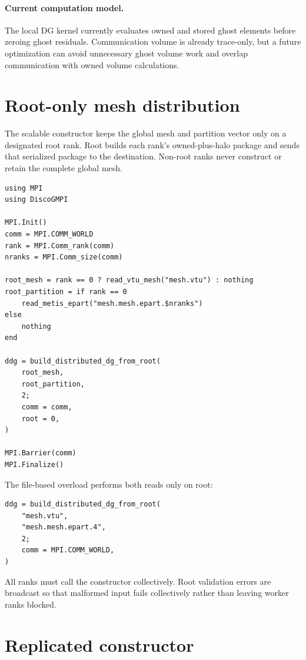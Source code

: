 \documentclass[11pt,oneside]{book}
\begin{document}
\paragraph{Current computation model.}
The local DG kernel currently evaluates owned and stored ghost elements before
zeroing ghost residuals. Communication volume is already trace-only, but a
future optimization can avoid unnecessary ghost volume work and overlap
communication with owned volume calculations.

\section{Root-only mesh distribution}

The scalable constructor keeps the global mesh and partition vector only on a
designated root rank. Root builds each rank's owned-plus-halo package and sends
that serialized package to the destination. Non-root ranks never construct or
retain the complete global mesh.

\begin{lstlisting}
using MPI
using DiscoGMPI

MPI.Init()
comm = MPI.COMM_WORLD
rank = MPI.Comm_rank(comm)
nranks = MPI.Comm_size(comm)

root_mesh = rank == 0 ? read_vtu_mesh("mesh.vtu") : nothing
root_partition = if rank == 0
    read_metis_epart("mesh.mesh.epart.$nranks")
else
    nothing
end

ddg = build_distributed_dg_from_root(
    root_mesh,
    root_partition,
    2;
    comm = comm,
    root = 0,
)

MPI.Barrier(comm)
MPI.Finalize()
\end{lstlisting}

The file-based overload performs both reads only on root:

\begin{lstlisting}
ddg = build_distributed_dg_from_root(
    "mesh.vtu",
    "mesh.mesh.epart.4",
    2;
    comm = MPI.COMM_WORLD,
)
\end{lstlisting}

All ranks must call the constructor collectively. Root validation errors are
broadcast so that malformed input fails collectively rather than leaving
worker ranks blocked.

\section{Replicated constructor}
\end{document}
